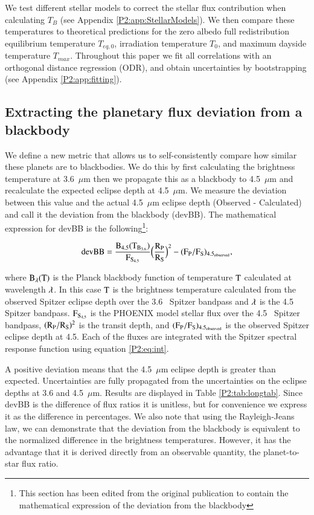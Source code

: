 
We test different stellar models to correct the stellar flux contribution when calculating $T_B$ (see Appendix \ref{P2:app:StellarModels}). We then compare these temperatures to theoretical predictions for the zero albedo full redistribution equilibrium temperature $T_{eq,\textit{0}}$, irradiation temperature $T_0$, and maximum dayside temperature $T_{max}$. Throughout this paper we fit all correlations with an orthogonal distance regression (ODR), and obtain uncertainties by bootstrapping (see Appendix \ref{P2:app:fitting}).

\subsection{Extracting the planetary flux deviation from a blackbody}

We define a new metric that allows us to self-consistently compare how similar these planets are to blackbodies. We do this by first calculating the brightness temperature at 3.6~$\mu$m then we propagate this as a blackbody to 4.5~$\mu$m and recalculate the expected eclipse depth at 4.5~$\mu$m. We measure the deviation between this value and the actual 4.5~$\mu$m eclipse depth (Observed - Calculated) and call it the deviation from the blackbody (devBB). The mathematical expression for devBB is the following\footnote{This section has been edited from the original publication to contain the mathematical expression of the deviation from the blackbody}:

\begin{equation}
    \rm devBB  = \frac{B_{4.5}(T_{B_{3.6}})}{F_{S_{4.5}}} \Big(\frac{R_P}{R_S}\Big)^2 - (F_P/F_S)_{4.5_{observed}},
\end{equation}

where $\rm B_{\lambda}(T)$ is the Planck blackbody function of temperature $\rm T$ calculated at wavelength $\rm \lambda$. In this case $\rm T$ is the brightness temperature calculated from the observed Spitzer eclipse depth over the 3.6\um~ Spitzer bandpass and $\rm \lambda$ is the 4.5\um~ Spitzer bandpass. $\rm F_{S_{4.5}}$ is the PHOENIX model stellar flux over the 4.5\um~ Spitzer bandpass, $\rm (R_P/R_S)^2$ is the transit depth, and $\rm (F_P/F_S)_{4.5_{observed}}$ is the observed Spitzer eclipse depth at 4.5\um. Each of the fluxes are integrated with the Spitzer spectral response function using equation \ref{P2:eq:int}.

A positive deviation means that the 4.5~$\mu$m eclipse depth is greater than expected. Uncertainties are fully propagated from the uncertainties on the eclipse depths at 3.6 and 4.5~$\mu$m. Results are displayed in Table \ref{P2:tab:longtab}. Since devBB is the difference of flux ratios it is unitless, but for convenience we express it as the difference in percentages. We also note that using the Rayleigh-Jeans law, we can demonstrate that the deviation from the blackbody is equivalent to the normalized difference in the brightness temperatures. However, it has the advantage that it is derived directly from an observable quantity, the planet-to-star flux ratio.

